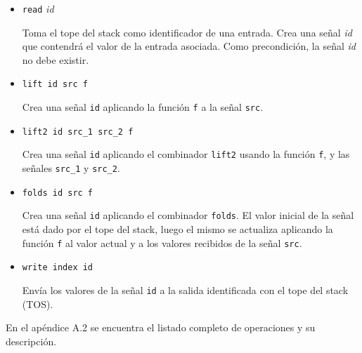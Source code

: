 \begin{itemize}

\item {
    \texttt{read} \textit{id}

      Toma el tope del stack como identificador de una entrada.
      Crea una señal \textit{id} que contendrá el valor de la entrada
    asociada. 
      Como precondición, la señal \textit{id} no debe existir.

    
}
\item {
    \texttt{lift id src f}

      Crea una señal \texttt{id} aplicando la función \texttt{f}
    a la señal \texttt{src}.
  
    
}
\item {
    \texttt{lift2 id src\_1 src\_2 f}

      Crea una señal \texttt{id} aplicando el combinador \texttt{lift2}
    usando la función \texttt{f}, y las señales \texttt{src\_1} y
    \texttt{src\_2}.

    
}
\item {
    \texttt{folds id src f}

      Crea una señal \texttt{id} aplicando el combinador \texttt{folds}.
    El valor inicial de la señal está dado por el tope del stack, luego
    el mismo se actualiza aplicando la función \texttt{f} al valor actual
    y a los valores recibidos de la señal \texttt{src}.

    
}
\item {
    \texttt{write index id}

      Envía los valores de la señal \texttt{id} a la salida identificada
    con el tope del stack (TOS).
    
    
}
\end{itemize}

  En el apéndice A.2 se encuentra el listado completo de operaciones y su
descripción.

